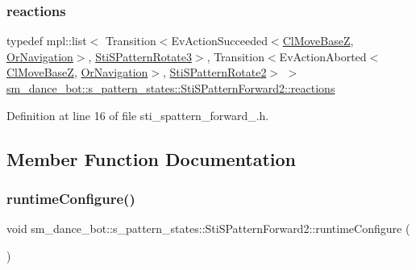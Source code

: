 \subsubsection{\texorpdfstring{reactions}{reactions}}
{\footnotesize\ttfamily typedef mpl\+::list$<$ Transition$<$Ev\+Action\+Succeeded$<$\hyperlink{classmove__base__z__client_1_1ClMoveBaseZ}{Cl\+Move\+BaseZ}, \hyperlink{classsm__dance__bot_1_1OrNavigation}{Or\+Navigation}$>$, \hyperlink{structsm__dance__bot_1_1s__pattern__states_1_1StiSPatternRotate3}{Sti\+S\+Pattern\+Rotate3}$>$, Transition$<$Ev\+Action\+Aborted$<$\hyperlink{classmove__base__z__client_1_1ClMoveBaseZ}{Cl\+Move\+BaseZ}, \hyperlink{classsm__dance__bot_1_1OrNavigation}{Or\+Navigation}$>$, \hyperlink{structsm__dance__bot_1_1s__pattern__states_1_1StiSPatternRotate2}{Sti\+S\+Pattern\+Rotate2}$>$ $>$ \hyperlink{structsm__dance__bot_1_1s__pattern__states_1_1StiSPatternForward2_a011ca35b5117f84d48e426d04ef9ae9f}{sm\+\_\+dance\+\_\+bot\+::s\+\_\+pattern\+\_\+states\+::\+Sti\+S\+Pattern\+Forward2\+::reactions}}



Definition at line 16 of file sti\+\_\+spattern\+\_\+forward\+\_.\+h.



\subsection{Member Function Documentation}
\mbox{\label{structsm__dance__bot_1_1s__pattern__states_1_1StiSPatternForward2_ad3ae0dc24f78ccdf564f77ce7d9d3afe}} 
\subsubsection{\texorpdfstring{runtime\+Configure()}{runtimeConfigure()}}
{\footnotesize\ttfamily void sm\+\_\+dance\+\_\+bot\+::s\+\_\+pattern\+\_\+states\+::\+Sti\+S\+Pattern\+Forward2\+::runtime\+Configure (\begin{DoxyParamCaption}{ }\end{DoxyParamCaption})\hspace{0.3cm}{\ttfamily [inline]}}



